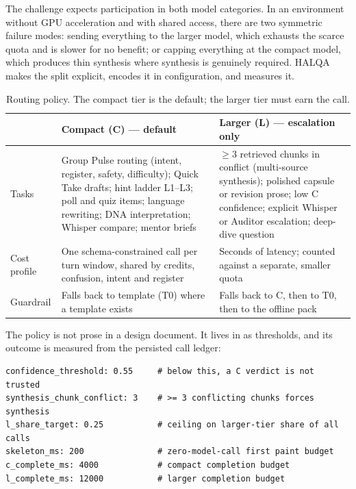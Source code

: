 The challenge expects participation in both model categories. In an environment without
GPU acceleration and with shared access, there are two symmetric failure modes: sending
everything to the larger model, which exhausts the scarce quota and is slower for no
benefit; or capping everything at the compact model, which produces thin synthesis where
synthesis is genuinely required. HALQA makes the split explicit, encodes it in
configuration, and measures it.

\begin{table}[htbp]
\centering
\caption{Routing policy. The compact tier is the default; the larger tier must earn the call.}
\label{tab:routing}
\footnotesize
\begin{tabularx}{\textwidth}{@{}p{3.0cm}X X@{}}
\toprule
& \textbf{Compact (C) --- default} & \textbf{Larger (L) --- escalation only} \\
\midrule
Tasks &
  Group Pulse routing (intent, register, safety, difficulty); Quick Take drafts; hint
  ladder L1--L3; poll and quiz items; language rewriting; DNA interpretation; Whisper
  compare; mentor briefs &
  $\ge 3$ retrieved chunks in conflict (multi-source synthesis); polished capsule or
  revision prose; low C confidence; explicit Whisper or Auditor escalation; deep-dive
  question \\
Cost profile &
  One schema-constrained call per turn window, shared by credits, confusion, intent and
  register &
  Seconds of latency; counted against a separate, smaller quota \\
Guardrail &
  Falls back to template (T0) where a template exists &
  Falls back to C, then to T0, then to the offline pack \\
\bottomrule
\end{tabularx}
\end{table}

The policy is not prose in a design document. It lives in  as
thresholds, and its outcome is measured from the persisted call ledger:

\begin{lstlisting}[caption={\code{config/router.yaml} --- the thresholds that the router reads at boot.}]
confidence_threshold: 0.55     # below this, a C verdict is not trusted
synthesis_chunk_conflict: 3    # >= 3 conflicting chunks forces synthesis
l_share_target: 0.25           # ceiling on larger-tier share of all calls
skeleton_ms: 200               # zero-model-call first paint budget
c_complete_ms: 4000            # compact completion budget
l_complete_ms: 12000           # larger completion budget
\end{lstlisting}

